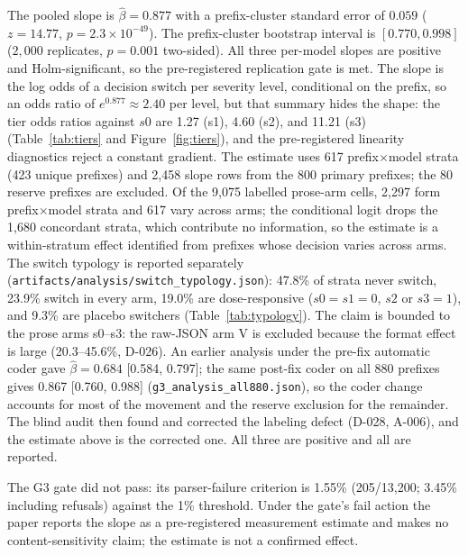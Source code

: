 \documentclass[a4paper,fleqn]{cas-sc}
\begin{document}
The pooled slope is $\hat\beta = 0.877$ with a prefix-cluster standard error of $0.059$
($z = 14.77$, $p = 2.3\times10^{-49}$). The prefix-cluster bootstrap interval is
$[0.770, 0.998]$ ($2{,}000$ replicates, $p = 0.001$ two-sided). All three per-model slopes
are positive and Holm-significant, so the pre-registered replication gate is met. The slope is
the log odds of a decision switch per severity level, conditional on the prefix, so an odds
ratio of $e^{0.877} \approx 2.40$ per level, but that summary hides the shape: the tier odds
ratios against $s0$ are 1.27 (s1), 4.60 (s2), and 11.21 (s3) (Table~\ref{tab:tiers} and
Figure~\ref{fig:tiers}), and the pre-registered linearity diagnostics reject a constant gradient. The estimate uses 617 prefix$\times$model strata
(423 unique prefixes) and 2{,}458 slope rows from the 800 primary prefixes; the 80 reserve
prefixes are excluded. Of the 9{,}075 labelled prose-arm cells, 2{,}297 form prefix$\times$model
strata and 617 vary across arms; the conditional logit drops the 1{,}680 concordant strata, which
contribute no information, so the estimate is a within-stratum effect identified from prefixes
whose decision varies across arms.
The switch typology is reported separately (\texttt{artifacts/analysis/switch\_typology.json}):
47.8\% of strata never switch, 23.9\% switch in every arm, 19.0\% are dose-responsive
($s0=s1=0$, $s2$ or $s3=1$), and 9.3\% are placebo switchers (Table~\ref{tab:typology}). The claim is bounded to the prose
arms s0--s3: the raw-JSON arm V is excluded because the format effect is large (20.3--45.6\%,
D-026). An earlier analysis under the pre-fix automatic coder gave $\hat\beta = 0.684$
[0.584, 0.797]; the same post-fix coder on all 880 prefixes gives 0.867 [0.760, 0.988]
(\texttt{g3\_analysis\_all880.json}), so the coder change accounts for most of the movement and
the reserve exclusion for the remainder. The blind audit then found and corrected the labeling
defect (D-028, A-006), and the estimate above is the corrected one. All three are positive and all
are reported.

The G3 gate did not pass: its parser-failure criterion is 1.55\% (205/13{,}200; 3.45\% including
refusals) against the 1\% threshold. Under the gate's fail action the paper reports the slope as a
pre-registered measurement estimate and makes no content-sensitivity claim; the estimate is not a
confirmed effect.
\end{document}
